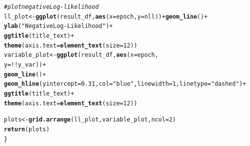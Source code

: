\documentclass[11pt, a4paper, english]{article}\usepackage[]{graphicx}\usepackage[dvipsnames]{xcolor}
\makeatletter
\newcommand{\hlnum}[1]{\textcolor[rgb]{0.686,0.059,0.569}{#1}}%
\newcommand{\hlstr}[1]{\textcolor[rgb]{0.192,0.494,0.8}{#1}}%
\newcommand{\hlcom}[1]{\textcolor[rgb]{0.678,0.584,0.686}{\textit{#1}}}%
\newcommand{\hlopt}[1]{\textcolor[rgb]{0,0,0}{#1}}%
\newcommand{\hlstd}[1]{\textcolor[rgb]{0.345,0.345,0.345}{#1}}%
\newcommand{\hlkwb}[1]{\textcolor[rgb]{0.69,0.353,0.396}{#1}}%
\newcommand{\hlkwc}[1]{\textcolor[rgb]{0.333,0.667,0.333}{#1}}%
\newcommand{\hlkwd}[1]{\textcolor[rgb]{0.737,0.353,0.396}{\textbf{#1}}}%
\newenvironment{kframe}{%
 \def\at@end@of@kframe{}%
 \ifinner\ifhmode%
  \def\at@end@of@kframe{\end{minipage}}%
  \begin{minipage}{\columnwidth}%
 \fi\fi%
 \def\FrameCommand##1{\hskip\@totalleftmargin \hskip-\fboxsep
 \colorbox{shadecolor}{##1}\hskip-\fboxsep
     \hskip-\linewidth \hskip-\@totalleftmargin \hskip\columnwidth}%
 \MakeFramed {\advance\hsize-\width
   \@totalleftmargin\z@ \linewidth\hsize
   \@setminipage}}%
 {\par\unskip\endMakeFramed%
 \at@end@of@kframe}
\newenvironment{knitrout}{}{} %
\makeatother
\begin{document}
\begin{knitrout}
\begin{kframe}
\begin{alltt}
   \hlcom{#plot negative Log-likelihood}
   \hlstd{ll_plot} \hlkwb{<-} \hlkwd{ggplot}\hlstd{(result_df,} \hlkwd{aes}\hlstd{(}\hlkwc{x}\hlstd{=epoch,} \hlkwc{y}\hlstd{=nll))} \hlopt{+} \hlkwd{geom_line}\hlstd{()} \hlopt{+}
     \hlkwd{ylab}\hlstd{(}\hlstr{"Negative Log-Likelihood"}\hlstd{)} \hlopt{+}
     \hlkwd{ggtitle}\hlstd{(title_text)} \hlopt{+}
     \hlkwd{theme}\hlstd{(}\hlkwc{axis.text} \hlstd{=} \hlkwd{element_text}\hlstd{(}\hlkwc{size} \hlstd{=} \hlnum{12}\hlstd{))}
  \hlstd{variable_plot} \hlkwb{<-}   \hlkwd{ggplot}\hlstd{(result_df,} \hlkwd{aes}\hlstd{(}\hlkwc{x} \hlstd{= epoch,}
                                           \hlkwc{y} \hlstd{=} \hlopt{!!}\hlstd{y_var))} \hlopt{+}
    \hlkwd{geom_line}\hlstd{()} \hlopt{+}
    \hlkwd{geom_hline}\hlstd{(}\hlkwc{yintercept} \hlstd{=} \hlnum{0.31}\hlstd{,} \hlkwc{col}\hlstd{=}\hlstr{"blue"}\hlstd{,}\hlkwc{linewidth}\hlstd{=}\hlnum{1}\hlstd{,} \hlkwc{linetype} \hlstd{=} \hlstr{"dashed"}\hlstd{)} \hlopt{+}
    \hlkwd{ggtitle}\hlstd{(title_text)} \hlopt{+}
    \hlkwd{theme}\hlstd{(}\hlkwc{axis.text} \hlstd{=} \hlkwd{element_text}\hlstd{(}\hlkwc{size} \hlstd{=} \hlnum{12}\hlstd{))}

   \hlstd{plots} \hlkwb{<-} \hlkwd{grid.arrange}\hlstd{(ll_plot, variable_plot,} \hlkwc{ncol}\hlstd{=}\hlnum{2}\hlstd{)}
  \hlkwd{return}\hlstd{(plots)}
\hlstd{\}}
\end{alltt}
\end{kframe}
\end{knitrout}
\end{document}
